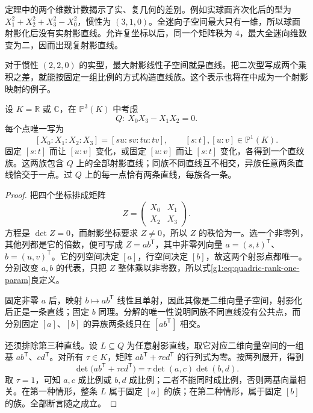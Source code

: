 定理中的两个维数计数揭示了实、复几何的差别。例如实球面齐次化后的型为 \(X_1^2+X_2^2+X_3^2-X_0^2\)，惯性为 \((3,1,0)\)。全迷向子空间最大只有一维，所以球面射影化后没有实射影直线。允许复坐标以后，同一个矩阵秩为 \(4\)，最大全迷向维数变为二，因而出现复射影直线。

\ProseParagraphBreak

对于惯性 \((2,2,0)\) 的实型，最大射影线性子空间就是直线。把二次型写成两个乘积之差，就能按固定一组比例的方式构造直线族。这个表示也将在中成为一个射影映射的例子。

\begin{proposition}
	\label{g1:prop:quadric-two-rulings}
	设 \(K=\mathbb R\) 或 \(\mathbb C\)，在 \(\mathbb P^3(K)\) 中考虑
	\[
		Q:\ X_0X_3-X_1X_2=0.
	\]
	每个点唯一写为
	\begin{equation}
		\label{g1:eq:quadric-rank-one-param}
		[X_0:X_1:X_2:X_3]
		=[su:sv:tu:tv],
		\qquad [s:t],[u:v]\in\mathbb P^1(K).
	\end{equation}
	固定 \([s:t]\) 而让 \([u:v]\) 变化，或固定 \([u:v]\) 而让 \([s:t]\) 变化，各得到一个直纹族。这两族包含 \(Q\) 上的全部射影直线；同族不同直线互不相交，异族任意两条直线恰交于一点。过 \(Q\) 上的每一点恰有两条直线，每族各一条。
\end{proposition}

\begin{proof}
	把四个坐标排成矩阵
	\[
		Z=\begin{pmatrix}X_0&X_1\\X_2&X_3\end{pmatrix}.
	\]
	方程是 \(\det Z=0\)，而射影坐标要求 \(Z\ne0\)，所以 \(Z\) 的秩恰为一。选一个非零列，其他列都是它的倍数，便可写成 \(Z=a b^{\mathsf T}\)，其中非零列向量 \(a=(s,t)^{\mathsf T}\)、\(b=(u,v)^{\mathsf T}\)。它的列空间决定 \([a]\)，行空间决定 \([b]\)，故这两个射影点都唯一。分别改变 \(a,b\) 的代表，只把 \(Z\) 整体乘以非零数，所以式\eqref{g1:eq:quadric-rank-one-param}良定义。

	固定非零 \(a\) 后，映射 \(b\mapsto ab^{\mathsf T}\) 线性且单射，因此其像是二维向量子空间，射影化后正是一条直线；固定 \(b\) 同理。分解的唯一性说明同族不同直线没有公共点，而分别固定 \([a]\)、\([b]\) 的异族两条线只在 \([ab^{\mathsf T}]\) 相交。

	还须排除第三种直线。设 \(L\subseteq Q\) 为任意射影直线，取它对应二维向量空间的一组基 \(ab^{\mathsf T}\)、\(cd^{\mathsf T}\)。对所有 \(\tau\in K\)，矩阵 \(ab^{\mathsf T}+\tau cd^{\mathsf T}\) 的行列式为零。按两列展开，得到
	\[
		\det\bigl(ab^{\mathsf T}+\tau cd^{\mathsf T}\bigr)
		=\tau\det(a,c)\det(b,d).
	\]
	取 \(\tau=1\)，可知 \(a,c\) 成比例或 \(b,d\) 成比例；二者不能同时成比例，否则两基向量相关。在第一种情形，整条 \(L\) 属于固定 \([a]\) 的族；在第二种情形，属于固定 \([b]\) 的族。全部断言随之成立。
\end{proof}

